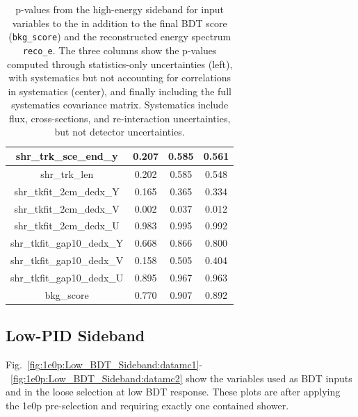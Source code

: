 \begin{table}[H]
\begin{tabular}{| c | c | c | c | }
shr\_trk\_sce\_end\_y & 0.207 & 0.585 & 0.561 \\ \hline
shr\_trk\_len & 0.202 & 0.585 & 0.548 \\ \hline
shr\_tkfit\_2cm\_dedx\_Y & 0.165 & 0.365 & 0.334 \\ \hline
shr\_tkfit\_2cm\_dedx\_V & 0.002 & 0.037 & 0.012 \\ \hline
shr\_tkfit\_2cm\_dedx\_U & 0.983 & 0.995 & 0.992 \\ \hline
shr\_tkfit\_gap10\_dedx\_Y & 0.668 & 0.866 & 0.800 \\ \hline
shr\_tkfit\_gap10\_dedx\_V & 0.158 & 0.505 & 0.404 \\ \hline
shr\_tkfit\_gap10\_dedx\_U & 0.895 & 0.967 & 0.963 \\ \hline
bkg\_score & 0.770 & 0.907 & 0.892 \\ \hline
 \end{tabular}
 \caption{\label{tab:1e0p:HE:pvalues}p-values from the high-energy \zpsel sideband for input variables to the \zpsel in addition to the final BDT score (\texttt{bkg\_score}) and the reconstructed energy spectrum \texttt{reco\_e}. The three columns show the p-values computed through statistics-only uncertainties (left), with systematics but not accounting for correlations in systematics (center), and finally including the full systematics covariance matrix. Systematics include flux, cross-sections, and re-interaction uncertainties, but not detector uncertainties.}
\end{table}

\subsection{\zpsel Low-PID Sideband}
\label{sec:zpLowPID_plots}

Fig.~\ref{fig:1e0p:Low_BDT_Sideband:datamc1}-~\ref{fig:1e0p:Low_BDT_Sideband:datamc2} show the variables used as BDT inputs and in the loose selection at low BDT response. These plots are after applying the 1e0p pre-selection and requiring exactly one contained shower.

